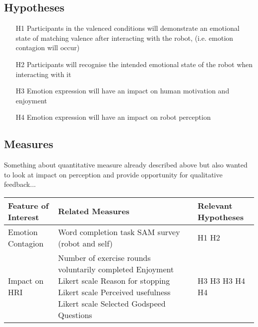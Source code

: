 \documentclass[11pt,a4paper]{report}
\begin{document}
\subsection{Hypotheses}
\begin{itemize}
	\item[H1] Participants in the valenced conditions will demonstrate an emotional state of matching valence after interacting with the robot, (i.e. emotion contagion will occur)
	\item[H2] Participants will recognise the intended emotional state of the robot when interacting with it
	\item[H3] Emotion expression will have an impact on human motivation and enjoyment 
	\item[H4] Emotion expression will have an impact on robot perception

\end{itemize}

\subsection{Measures}

Something about quantitative measure already described above but also wanted to look at impact on perception and provide opportunity for qualitative feedback...

\begin{tabular}{|l|p{7cm}|p{3.8cm}|}
\hline Feature of Interest & Related Measures & Relevant Hypotheses \\ 
\hline Emotion Contagion & Word completion task \newline SAM survey (robot and self) & H1 \newline H2 \\ 
\hline Impact on HRI & Number of exercise rounds voluntarily completed \newline Enjoyment Likert scale \newline Reason for stopping Likert scale \newline Perceived usefulness Likert scale \newline Selected Godspeed Questions &  H3 \newline \newline H3 \newline H3 \newline H4 \newline H4 \\
\hline 
\end{tabular} 
\end{document}
